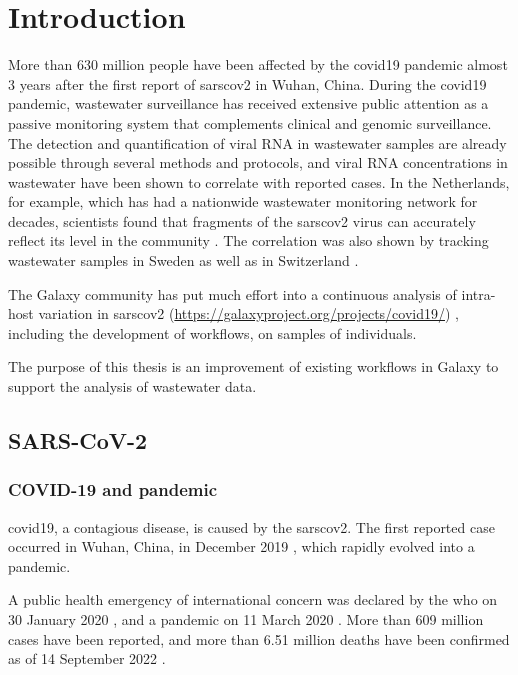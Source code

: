 %
\section{Introduction}
More than 630 million people have been affected by the \acrshort{covid19} pandemic almost 3 years after the first report of \acrshort{sarscov2} in Wuhan, China. During the \acrshort{covid19} pandemic, wastewater surveillance has received extensive public attention as a passive monitoring system that complements clinical and genomic surveillance. The detection and quantification of viral RNA in wastewater samples are already possible through several methods and protocols, and viral RNA concentrations in wastewater have been shown to correlate with reported cases. In the Netherlands, for example, which has had a nationwide wastewater monitoring network for decades, scientists found that fragments of the \acrshort{sarscov2} virus can accurately reflect its level in the community \cite{medema2020}. The correlation was also shown by tracking wastewater samples in Sweden as well as in Switzerland \cite{wang2022,jahn2022}. 

The Galaxy community has put much effort into a continuous analysis of intra-host variation in \acrshort{sarscov2} (\url{https://galaxyproject.org/projects/covid19/}) \cite{baker2020,maier2021,mei2021,martin2021}, including the development of workflows, on samples of individuals.
    
The purpose of this thesis is an improvement of existing workflows in Galaxy to support the analysis of wastewater data.

    \subsection{SARS-CoV-2}
        \subsubsection{COVID-19 and pandemic}
        \acrfull{covid19}, a contagious disease, is caused by the \acrfull{sarscov2}. The first reported case occurred in Wuhan, China, in December 2019 \cite{wu2020}, which rapidly evolved into a pandemic.
        
        A public health emergency of international concern was declared by the \acrfull{who} on 30 January 2020 \cite{statement2020}, and a pandemic on 11 March 2020 \cite{who2020,cucinotta2020}. More than 609 million cases have been reported, and more than 6.51 million deaths have been confirmed as of 14 September 2022 \cite{weekly2022}.
        
